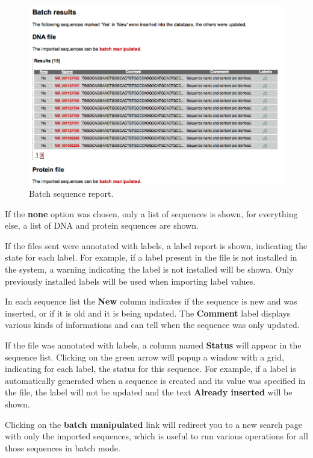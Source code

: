 \begin{figure}[ht]
  \centering
    \includegraphics[scale=0.5]{batch_report2.png}
  \caption{Batch sequence report.}
  \label{fig:batch_report2}
\end{figure}

If the \textbf{none} option was chosen, only a list of sequences is shown, for everything else,
a list of DNA and protein sequences are shown.

If the files sent were annotated with labels, a label report is shown, indicating the state for each label.
For example, if a label present in the file is not installed in the system, a warning indicating the label
is not installed will be shown. Only previously installed labels will be used when importing label values.

In each sequence list the \textbf{New} column indicates if the sequence is new and was inserted, or if it is old
and it is being updated. The \textbf{Comment} label displays various kinds of informations and can tell when
the sequence was only updated.

If the file was annotated with labels, a column named \textbf{Status} will appear in the sequence list. Clicking
on the green arrow will popup a window with a grid, indicating for each label, the status for this sequence.
For example, if a label is automatically generated when a sequence is created and its value was specified in the file,
the label will not be updated and the text \textbf{Already inserted} will be shown.

Clicking on the \textbf{batch manipulated} link will redirect you to a new search page with only the imported sequences,
which is useful to run various operations for all those sequences in batch mode.

